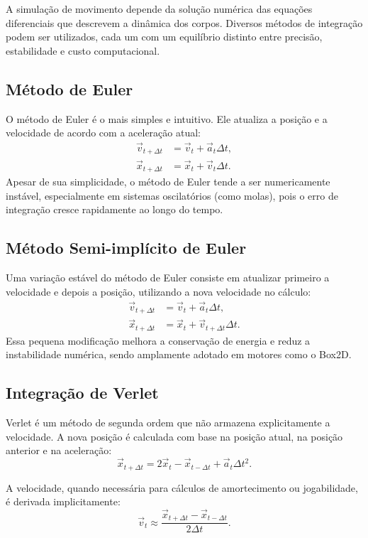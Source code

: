 A simulação de movimento depende da solução numérica das equações diferenciais que descrevem a dinâmica dos corpos. Diversos métodos de integração podem ser utilizados, cada um com um equilíbrio distinto entre precisão, estabilidade e custo computacional.

\subsection*{Método de Euler}

O método de Euler é o mais simples e intuitivo. Ele atualiza a posição e a velocidade de acordo com a aceleração atual:
\begin{align*}
	\vec v_{t+\Delta t} &= \vec v_t + \vec a_t \Delta t, \\
	\vec x_{t+\Delta t} &= \vec x_t + \vec v_t \Delta t.
\end{align*}
Apesar de sua simplicidade, o método de Euler tende a ser numericamente instável, especialmente em sistemas oscilatórios (como molas), pois o erro de integração cresce rapidamente ao longo do tempo.

\subsection*{Método Semi-implícito de Euler}

Uma variação estável do método de Euler consiste em atualizar primeiro a velocidade e depois a posição, utilizando a nova velocidade no cálculo:
\begin{align*}
	\vec v_{t+\Delta t} &= \vec v_t + \vec a_t \Delta t, \\
	\vec x_{t+\Delta t} &= \vec x_t + \vec v_{t+\Delta t} \Delta t.
\end{align*}
Essa pequena modificação melhora a conservação de energia e reduz a instabilidade numérica, sendo amplamente adotado em motores como o Box2D.

\subsection*{Integração de Verlet}

Verlet é um método de segunda ordem que não armazena explicitamente a velocidade. A nova posição é calculada com base na posição atual, na posição anterior e na aceleração:
$$
	\vec x_{t+\Delta t} = 2\vec x_t - \vec x_{t-\Delta t} + \vec a_t \Delta t^2.
$$

A velocidade, quando necessária para cálculos de amortecimento ou jogabilidade, é derivada implicitamente:
$$
	\vec v_t \approx \frac{\vec x_{t+\Delta t} - \vec x_{t-\Delta t}}{2\Delta t}.
$$

